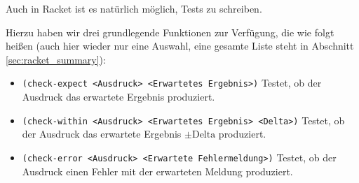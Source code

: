 
Auch in Racket ist es natürlich möglich, Tests zu schreiben.

Hierzu haben wir drei grundlegende Funktionen zur Verfügung, die wie folgt heißen (auch hier wieder nur eine Auswahl, eine gesamte Liste steht in Abschnitt \ref{sec:racket_summary}):
\begin{itemize}
	\item \lstinline[language = Racket]|(check-expect <Ausdruck> <Erwartetes Ergebnis>)| Testet, ob der Ausdruck das erwartete Ergebnis produziert.
	\item \lstinline[language = Racket]|(check-within <Ausdruck> <Erwartetes Ergebnis> <Delta>)| Testet, ob der Ausdruck das erwartete Ergebnis \( \pm\text{Delta} \) produziert.
	\item \lstinline[language = Racket]|(check-error <Ausdruck> <Erwartete Fehlermeldung>)| Testet, ob der Ausdruck einen Fehler mit der erwarteten Meldung produziert.
\end{itemize}
